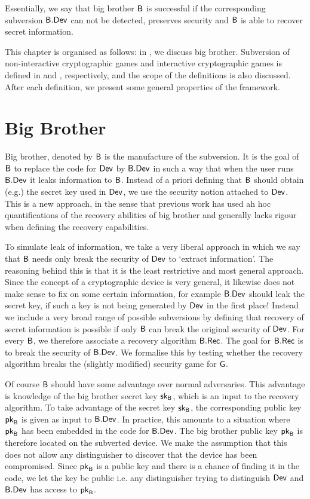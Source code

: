 Essentially, we say that big brother $\mathsf{B}$ is successful if the corresponding subversion $\mathsf{B}.\mathsf{Dev}$ can not be detected, preserves security and $\mathsf{B}$ is able to recover secret information. 

This chapter is organised as follows: in , we discuss big brother. Subversion of non-interactive cryptographic games and interactive cryptographic games is defined in  and , respectively, and the scope of the definitions is also discussed. After each definition, we present some general properties of the framework.   

\section{Big Brother}

Big brother, denoted by $\mathsf{B}$ is the manufacture of the subversion. It is the goal of $\mathsf{B}$ to replace the code for $\operatorname{\mathsf{Dev}}$ by $\mathsf{B}.\mathsf{Dev}$ in such a way that when the user runs $\mathsf{B}.\mathsf{Dev}$ it leaks information to $\mathsf{B}$. Instead of a priori defining that $\mathsf{B}$ should obtain (e.g.) the secret key used in $\operatorname{\mathsf{Dev}}$, we use the security notion attached to $\operatorname{\mathsf{Dev}}$. This is a new approach, in the sense that previous work has used ah hoc quantifications of the recovery abilities of big brother and generally lacks rigour when defining the recovery capabilities. 

To simulate leak of information, we take a very liberal approach in which we say that $\mathsf{B}$ needs only break the security of $\operatorname{\mathsf{Dev}}$ to `extract information'. The reasoning behind this is that it is the least restrictive and most general approach. Since the concept of a cryptographic device is very general, it likewise does not make sense to fix on some certain information, for example $\mathsf{B}.\mathsf{Dev}$ should leak the secret key, if such a key is not being generated by $\operatorname{\mathsf{Dev}}$ in the first place! Instead we include a very broad range of possible subversions by defining that recovery of secret information is possible if only $\mathsf{B}$ can break the original security of $\operatorname{\mathsf{Dev}}$. For every $\mathsf{B}$, we therefore associate a recovery algorithm $\mathsf{B}.\mathsf{Rec}$. The goal for $\mathsf{B}.\mathsf{Rec}$ is to break the security of $\mathsf{B}.\mathsf{Dev}$. We formalise this by testing whether the recovery algorithm breaks the (slightly modified) security game for $\operatorname{\mathsf{G}}$. 

Of course $\mathsf{B}$ should have some advantage over normal adversaries. This advantage is knowledge of the big brother secret key $\mathsf{sk}_{\mathsf{B}}$, which is an input to the recovery algorithm. To take advantage of the secret key $\mathsf{sk}_{\mathsf{B}}$, the corresponding public key $\mathsf{pk}_{\mathsf{B}}$ is given as input to $\mathsf{B}.\mathsf{Dev}$. In practice, this amounts to a situation where $\mathsf{pk}_{\mathsf{B}}$ has been embedded in the code for $\mathsf{B}.\mathsf{Dev}$. The big brother public key $\mathsf{pk}_{\mathsf{B}}$ is therefore located on the subverted device. We make the assumption that this does not allow any distinguisher to discover that the device has been compromised. Since $\mathsf{pk}_{\mathsf{B}}$ is a public key and there is a chance of finding it in the code, we let the key be public i.e. any distinguisher trying to distinguish $\operatorname{\mathsf{Dev}}$ and $\mathsf{B}.\mathsf{Dev}$ has access to $\mathsf{pk}_{\mathsf{B}}$. 

